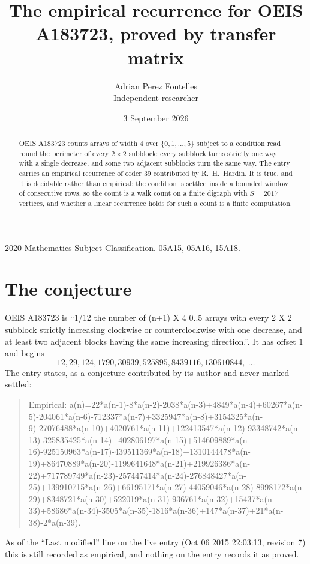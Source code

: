 \documentclass[11pt,a4paper]{article}
\title{The empirical recurrence for OEIS A183723, proved by transfer matrix}
\author{Adrian Perez Fontelles\\ \small Independent researcher}
\date{3 September 2026}
\theoremstyle{plain}
\theoremstyle{definition}
\begin{document}
\maketitle

\begin{abstract}
OEIS A183723 counts arrays of width $4$ over $\{0,1,\dots,5\}$ subject to a condition read round the
perimeter of every $2\times2$ subblock: every subblock turns strictly one way with a single decrease, and some two adjacent subblocks turn the same way. The entry carries an empirical recurrence of
order $39$ contributed by R.~H.~Hardin. It is true, and it is decidable rather than
empirical: the condition is settled inside a bounded window of consecutive rows, so the
count is a walk count on a finite digraph with $S=2017$ vertices, and whether a linear
recurrence holds for such a count is a finite computation.
\end{abstract}

\noindent\small 2020 Mathematics Subject Classification. 05A15, 05A16, 15A18.\normalsize

\section{The conjecture}

OEIS A183723 is ``1/12 the number of (n+1) X 4 0..5 arrays with every 2 X 2 subblock strictly increasing clockwise or counterclockwise with one decrease, and at least two adjacent blocks having the same increasing direction.''. It has offset $1$ and begins
\[
12, 29, 124, 1790, 30939, 525895, 8439116, 130610844,\ \dots
\]
The entry states, as a conjecture contributed by its author and never marked settled:
\begin{quote}
Empirical: a(n)=22*a(n-1)-8*a(n-2)-2038*a(n-3)+4849*a(n-4)+60267*a(n-5)-204061*a(n-6)-712337*a(n-7)+3325947*a(n-8)+3154325*a(n-9)-27076488*a(n-10)+4020761*a(n-11)+122413547*a(n-12)-93348742*a(n-13)-325835425*a(n-14)+402806197*a(n-15)+514609889*a(n-16)-925150963*a(n-17)-439511369*a(n-18)+1310144478*a(n-19)+86470889*a(n-20)-1199641648*a(n-21)+219926386*a(n-22)+717789749*a(n-23)-257447414*a(n-24)-276848427*a(n-25)+139910715*a(n-26)+66195171*a(n-27)-44059046*a(n-28)-8998172*a(n-29)+8348721*a(n-30)+522019*a(n-31)-936761*a(n-32)+15437*a(n-33)+58686*a(n-34)-3505*a(n-35)-1816*a(n-36)+147*a(n-37)+21*a(n-38)-2*a(n-39).
\end{quote}
As of the ``Last modified'' line on the live entry (Oct 06 2015 22:03:13, revision 7) this is still
recorded as empirical, and nothing on the entry records it as proved.
\end{document}
